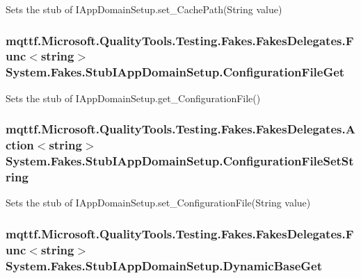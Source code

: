 Sets the stub of I\-App\-Domain\-Setup.\-set\-\_\-\-Cache\-Path(\-String value)

\hypertarget{class_system_1_1_fakes_1_1_stub_i_app_domain_setup_a58980113b40f58d86c0c2d30a4466767}{
\subsubsection[{Configuration\-File\-Get}]{\setlength{\rightskip}{0pt plus 5cm}mqttf.\-Microsoft.\-Quality\-Tools.\-Testing.\-Fakes.\-Fakes\-Delegates.\-Func$<$string$>$ System.\-Fakes.\-Stub\-I\-App\-Domain\-Setup.\-Configuration\-File\-Get}}\label{class_system_1_1_fakes_1_1_stub_i_app_domain_setup_a58980113b40f58d86c0c2d30a4466767}


Sets the stub of I\-App\-Domain\-Setup.\-get\-\_\-\-Configuration\-File()

\hypertarget{class_system_1_1_fakes_1_1_stub_i_app_domain_setup_a5bcfc179fc0a8147049ffe98908768e4}{
\subsubsection[{Configuration\-File\-Set\-String}]{\setlength{\rightskip}{0pt plus 5cm}mqttf.\-Microsoft.\-Quality\-Tools.\-Testing.\-Fakes.\-Fakes\-Delegates.\-Action$<$string$>$ System.\-Fakes.\-Stub\-I\-App\-Domain\-Setup.\-Configuration\-File\-Set\-String}}\label{class_system_1_1_fakes_1_1_stub_i_app_domain_setup_a5bcfc179fc0a8147049ffe98908768e4}


Sets the stub of I\-App\-Domain\-Setup.\-set\-\_\-\-Configuration\-File(\-String value)

\hypertarget{class_system_1_1_fakes_1_1_stub_i_app_domain_setup_a8989f5c25e148d5d235ba2fbec37de64}{
\subsubsection[{Dynamic\-Base\-Get}]{\setlength{\rightskip}{0pt plus 5cm}mqttf.\-Microsoft.\-Quality\-Tools.\-Testing.\-Fakes.\-Fakes\-Delegates.\-Func$<$string$>$ System.\-Fakes.\-Stub\-I\-App\-Domain\-Setup.\-Dynamic\-Base\-Get}}\label{class_system_1_1_fakes_1_1_stub_i_app_domain_setup_a8989f5c25e148d5d235ba2fbec37de64}


